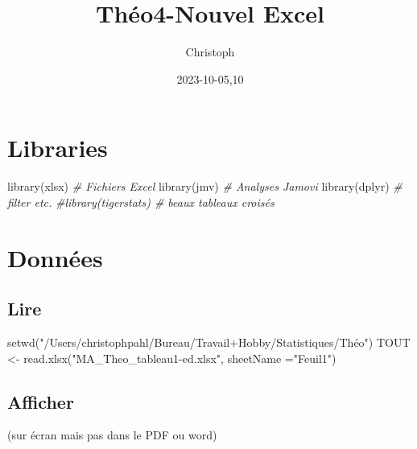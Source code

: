 \documentclass[
]{article}
\title{Théo4-Nouvel Excel}
\author{Christoph}
\date{2023-10-05,10}
\newenvironment{Shaded}{\begin{snugshade}}{\end{snugshade}}
\newcommand{\AttributeTok}[1]{\textcolor[rgb]{0.77,0.63,0.00}{#1}}
\newcommand{\CommentTok}[1]{\textcolor[rgb]{0.56,0.35,0.01}{\textit{#1}}}
\newcommand{\FunctionTok}[1]{\textcolor[rgb]{0.00,0.00,0.00}{#1}}
\newcommand{\NormalTok}[1]{#1}
\newcommand{\OtherTok}[1]{\textcolor[rgb]{0.56,0.35,0.01}{#1}}
\newcommand{\StringTok}[1]{\textcolor[rgb]{0.31,0.60,0.02}{#1}}
\begin{document}
\maketitle

\hypertarget{libraries}{%
\section{Libraries}\label{libraries}}

\begin{Shaded}
\begin{Highlighting}[]
\FunctionTok{library}\NormalTok{(xlsx)                                         }\CommentTok{\# Fichiers Excel}
\FunctionTok{library}\NormalTok{(jmv)                                          }\CommentTok{\# Analyses Jamovi}
\FunctionTok{library}\NormalTok{(dplyr)                                        }\CommentTok{\# filter etc.}
\CommentTok{\#library(tigerstats)                                   \# beaux tableaux croisés}
\end{Highlighting}
\end{Shaded}

\hypertarget{donnuxe9es}{%
\section{Données}\label{donnuxe9es}}

\hypertarget{lire}{%
\subsection{Lire}\label{lire}}

\begin{Shaded}
\begin{Highlighting}[]
\FunctionTok{setwd}\NormalTok{(}\StringTok{"/Users/christophpahl/Bureau/Travail+Hobby/Statistiques/Théo"}\NormalTok{)}
\NormalTok{TOUT }\OtherTok{\textless{}{-}} \FunctionTok{read.xlsx}\NormalTok{(}\StringTok{"MA\_Theo\_tableau1{-}ed.xlsx"}\NormalTok{, }\AttributeTok{sheetName =}\StringTok{"Feuil1"}\NormalTok{) }
\end{Highlighting}
\end{Shaded}

\hypertarget{afficher}{%
\subsection{Afficher}\label{afficher}}

(sur écran mais pas dans le PDF ou word)
\end{document}
